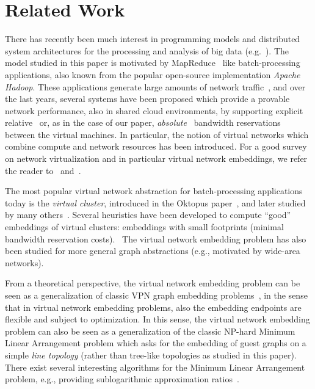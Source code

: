 \documentclass[9pt]{sigcomm-alternate}
\begin{document}
\section{Related Work}\label{sec:relwork}

There has recently been much interest in programming models and distributed
system architectures for the processing and analysis of big data (e.g.~\cite{nodb,mapreduce,shark}). The model studied in
this paper is motivated by MapReduce~\cite{mapreduce} like batch-processing applications, also known
from the popular open-source implementation \emph{Apache Hadoop}.
These applications
generate large amounts of network traffic~\cite{orchestra,talk-about,amazonbw},
and over the last years, several systems have been proposed which provide
a provable network performance, also in shared cloud environments, by supporting explicit
relative~\cite{faircloud,elasticswitch,seawall}
or, as in the case of our paper, \emph{absolute}~\cite{oktopus,secondnet,drl,gatekeeper,proteus} bandwidth reservations
between the virtual machines.
In particular, the notion of virtual networks which combine compute and network resources has been introduced.
For a good survey on network virtualization and in particular virtual network embeddings,
we refer the reader to~\cite{boutaba-survey} and~\cite{fischer-survey}.

The most popular virtual network abstraction for batch-processing applications today is the \emph{virtual cluster},
introduced in the Oktopus paper~\cite{oktopus}, and later studied by many others~\cite{talk-about,proteus}.
Several heuristics have been developed to compute ``good'' embeddings of virtual clusters: embeddings
with small footprints (minimal bandwidth reservation costs).~\cite{oktopus,talk-about,proteus}
The virtual network embedding problem has also been studied for more general graph abstractions
(e.g., motivated by wide-area networks).~\cite{infocom2009,ammar,turner,simannealing,ucc12mip,zhu06}

From a theoretical perspective, the virtual network embedding problem can be seen as a generalization
of classic VPN graph embedding problems~\cite{Goyal2008,gupta2001provisioning},
in the sense that in virtual network embedding problems, also the embedding endpoints are flexible and subject to optimization.
In this sense, the virtual network embedding problem can also be seen as a generalization of the
classic NP-hard Minimum Linear Arrangement problem which asks for the
embedding of guest graphs on a simple \emph{line topology} (rather than tree-like topologies as
studied in this paper).~\cite{mla,mla-survey}
There exist several interesting algorithms for the Minimum Linear Arrangement problem,
e.g., providing sublogarithmic approximation ratios~\cite{mla-feige}.
\end{document}
